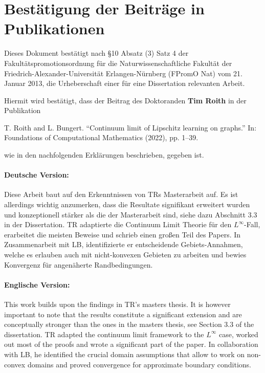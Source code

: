 \documentclass[12pt]{article}
\begin{document}
\section*{Bestätigung der Beiträge in Publikationen}

Dieses Dokument bestätigt nach \S10 Absatz (3) Satz 4 der Fakultätspromotionsordnung für die Naturwissenschaftliche Fakultät der
Friedrich-Alexander-Universität Erlangen-Nürnberg (FPromO Nat) vom 21. Januar 2013, die Urheberschaft einer für eine Dissertation relevanten Arbeit.\par

\vspace{15pt}
\noindent
Hiermit wird bestätigt, dass der Beitrag des Doktoranden \textbf{Tim Roith} in der Publikation
%
\begin{center}
T. Roith and L. Bungert. “Continuum limit of Lipschitz learning on graphs.”
In: Foundations of Computational Mathematics (2022), pp. 1–39.
\end{center}
%
wie in den nachfolgenden Erklärungen beschrieben, gegeben ist.

\paragraph{Deutsche Version:} Diese Arbeit baut auf den Erkenntnissen von TRs Masterarbeit auf. Es ist allerdings wichtig anzumerken, dass die Resultate signifikant erweitert wurden und konzeptionell stärker als die der Masterarbeit sind, siehe dazu Abschnitt 3.3 in der Dissertation. TR adaptierte die Continuum Limit Theorie für den $L^\infty$-Fall, erarbeitet die meisten Beweise und schrieb einen großen Teil des Papers. In Zusammenarbeit mit LB, identifizierte er entscheidende Gebiets-Annahmen, welche es erlauben auch mit nicht-konvexen Gebieten zu arbeiten und bewies Konvergenz für angenäherte Randbedingungen.  

\paragraph{Englische Version:} This work builds upon the findings in TR's masters thesis. It is however important to note that the results constitute a significant extension and are conceptually stronger than the ones in the masters thesis, see Section 3.3 of the dissertation. TR adapted the continuum limit framework to the $L^\infty$ case, worked out most of the proofs and wrote a significant part of the paper. In collaboration with LB, he identified the crucial domain assumptions that allow to work on non-convex domains and proved convergence for approximate boundary conditions.
\vspace{50pt}
\end{document}
